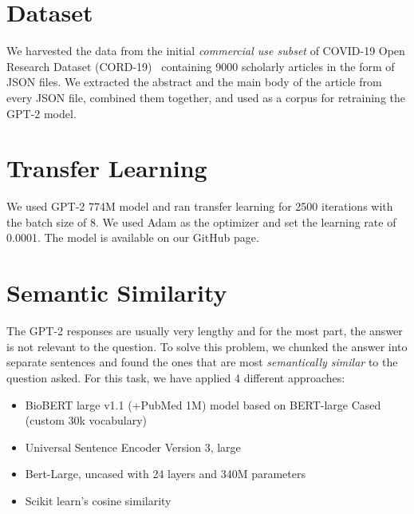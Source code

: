 \documentclass[sigconf,natbib=false]{acmart}
\begin{document}

\section{Dataset}

We harvested the data from the initial \textit{commercial use subset} of
COVID-19 Open Research Dataset (CORD-19)~\cite{cord19} containing 9000
scholarly articles in the form of JSON files. We extracted the abstract and the
main body of the article from every JSON file, combined them together, and used
as a corpus for retraining the GPT-2 model.


\section{Transfer Learning}

We used GPT-2 774M model and ran transfer learning for 2500 iterations with the
batch size of 8. We used Adam as the optimizer and set the learning rate of
0.0001. The model is available on our GitHub page.


\section{Semantic Similarity}

The GPT-2 responses are usually very lengthy and for the most part, the answer
is not relevant to the question. To solve this problem, we chunked the answer
into separate sentences and found the ones that are most \textit{semantically
  similar} to the question asked. For this task, we have applied 4 different
approaches:

\begin{itemize}
  \item BioBERT large v1.1 (+PubMed 1M) model based on BERT-large Cased (custom 30k vocabulary)
  \item Universal Sentence Encoder Version 3, large
  \item Bert-Large, uncased with 24 layers and 340M parameters
  \item Scikit learn's cosine similarity
\end{itemize}
\end{document}
